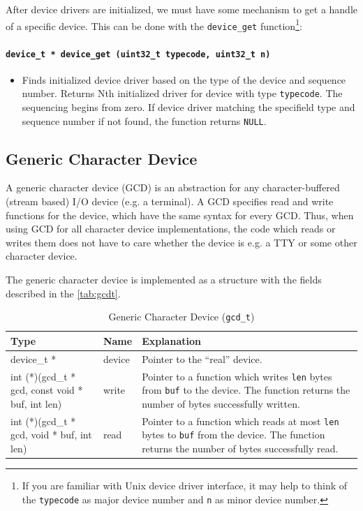 \documentclass[twoside,a4paper]{report}
\makeatletter
\newcommand{\PBS}[1]{\let\temp=\\#1\let\\=\temp}
\newlength{\tablewidth}
\newenvironment{function}[3]{%
\paragraph{\texttt{#1 {\textbf{#2}} (#3)}}%
\index{#2@\texttt{#2}}%
\begin{itemize}%
}{%
\end{itemize}%
}
\makeatother
\begin{document}
After device drivers are initialized, we must have some mechanism to
get a handle of a specific device. This can be done with
the \texttt{device\_get} function\footnote{If you are familiar with
Unix device driver interface, it may help to think of the
\texttt{typecode} as major device number and \texttt{n} as minor
device number.}:

\begin{function}{device\_t *}{device\_get}{uint32\_t typecode, uint32\_t n}
\item Finds initialized device driver based on the type of the device
and sequence number. Returns Nth initialized driver for device with
type \texttt{typecode}. The sequencing begins from zero. If device
driver matching the specifield type and sequence number if not found,
the function returns \texttt{NULL}.
\end{function}

\subsection{Generic Character Device}
\label{sec:gcd}


A generic character device (GCD) is an abstraction for any
character-buffered (stream based) I/O device (e.g. a terminal). A GCD
specifies read and write functions for the device, which have the same
syntax for every GCD. Thus, when using GCD for all character device
implementations, the code which reads or writes them does not have to
care whether the device is e.g. a TTY or some other character device.

The generic character device is implemented as a structure with the
fields described in the \autoref{tab:gcdt}.

\begin{table}
\begin{center}
\begin{tabularx}{\tablewidth}{p{3.5cm}|l|>{\PBS\raggedright}X}
\textbf{Type}     & \textbf{Name}    & \textbf{Explanation} \\
\hline

device\_t * & device & Pointer to the ``real'' device. \\

\hline

int (*)(gcd\_t * gcd, const void * buf, int len)  & write & Pointer to a
function which writes \texttt{len} bytes from \texttt{buf} to the
device. The function returns the number of bytes successfully written.
\\

\hline

int (*)(gcd\_t * gcd, void * buf, int len) & read & Pointer to a
function which reads at most \texttt{len} bytes to \texttt{buf} from
the device. The function returns the number of bytes successfully
read. \\

\end{tabularx}
\end{center}
\caption{Generic Character Device (\texttt{gcd\_t})}
\label{tab:gcdt}
\end{table}
\end{document}
